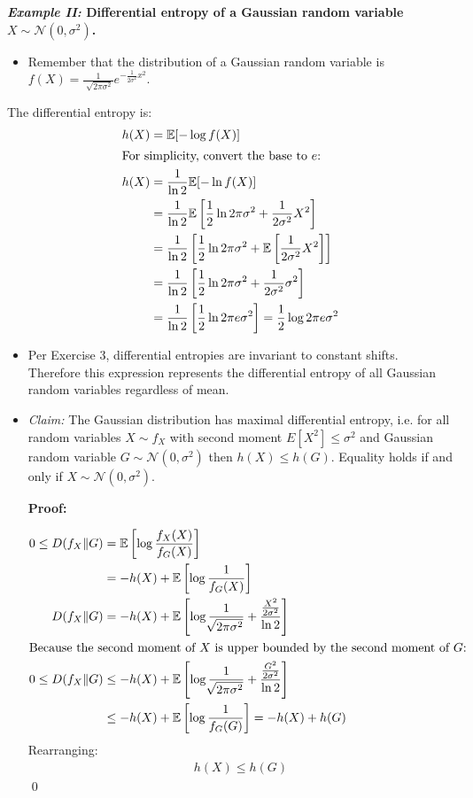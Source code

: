 \documentclass[12pt]{extarticle}
\newcommand{\EE}{\mathbb{E}}
\newcommand{\eq}[1]{\begin{align*}#1\end{align*}}
\begin{document}
\noindent \textbf{\textit{Example II:} Differential entropy of a Gaussian random variable $X \sim \mathcal{N}(0, \sigma^2)$.}
\begin{itemize}
\item Remember that the distribution of a Gaussian random variable is $f(X) = \frac{1}{\sqrt[]{2 \pi \sigma^2}}e^{- \frac{1}{2 \sigma^2}x^2}$.
\end{itemize}
The differential entropy is:
\eq{h(X) &= \EE[- \log f(X)]\\
\intertext{For simplicity, convert the base to $e$:}
h(X) &= \frac{1}{\ln 2} \EE[- \ln f(X)]\\
&= \frac{1}{\ln 2} \EE\left[ \frac{1}{2}\ln 2 \pi \sigma^2 + \frac{1}{2 \sigma^2} X^2 \right] \\
&= \frac{1}{\ln 2} \left[ \frac{1}{2}\ln 2 \pi \sigma^2 + \EE\left[\frac{1}{2 \sigma^2} X^2 \right]\right] \\
&= \frac{1}{\ln 2} \left[ \frac{1}{2}\ln 2 \pi \sigma^2 + \frac{1}{2 \sigma^2} \sigma^2 \right] \\
&= \frac{1}{\ln 2} \left[ \frac{1}{2} \ln 2 \pi e \sigma^2 \right] = \frac{1}{2} \log 2\pi e \sigma^2
}
\begin{itemize}
\item Per Exercise 3, differential entropies are invariant to constant shifts. Therefore this expression represents the differential entropy of all Gaussian random variables regardless of mean.
\item \textit{Claim:} The Gaussian distribution has maximal differential entropy, i.e. for all random variables $X \sim f_X$ with second moment $E[X^2] \leq \sigma^2$ and Gaussian random variable $G \sim \mathcal{N}(0, \sigma^2)$ then $h(X) \leq h(G)$. Equality holds if and only if $X \sim \mathcal{N}(0, \sigma^2)$.

\textbf{Proof:}

\eq{0 \leq D(f_X \Vert G ) &= \EE \left[ \log \frac{f_X(X)}{f_G(X)} \right] \\
&= - h(X) + \EE \left[ \log \frac{1}{f_G(X)} \right]\\
D(f_X \Vert G ) &= - h(X) + \EE \left[ \log \frac{1}{\sqrt[]{2 \pi \sigma^2}} + \frac{\frac{X^2}{2 \sigma^2}}{\ln 2} \right]\\
\intertext{Because the second moment of $X$ is upper bounded by the second moment of $G$:}
0 \leq D(f_X \Vert G ) &\leq - h(X) + \EE \left[ \log \frac{1}{\sqrt[]{2 \pi \sigma^2}} + \frac{\frac{G^2}{2 \sigma^2}}{\ln 2} \right]\\
&\leq - h(X) + \EE \left[ \log \frac{1}{f_G (G)}\right] = -h(X) + h(G)
}
Rearranging:
\eq{h(X) \leq h(G)}
\qed
\end{itemize}
\end{document}
